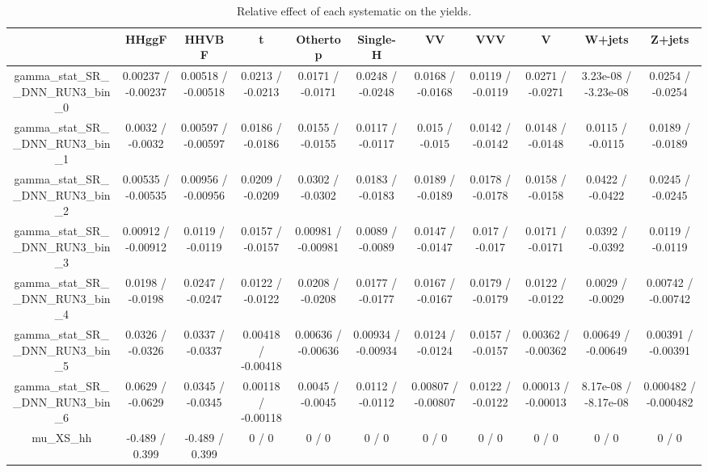 \documentclass[10pt]{article}
\begin{document}
\begin{table}[htbp]
\begin{center}
\begin{tabular}{|c|c|c|c|c|c|c|c|c|c|c|}
\hline 
      & HHggF      & HHVBF      & t      & Othertop      & Single-H      & VV      & VVV      & V      & W+jets      & Z+jets \\ 
\hline 
  gamma_stat_SR__DNN_RUN3_bin_0 & 0.00237 / -0.00237 & 0.00518 / -0.00518 & 0.0213 / -0.0213 & 0.0171 / -0.0171 & 0.0248 / -0.0248 & 0.0168 / -0.0168 & 0.0119 / -0.0119 & 0.0271 / -0.0271 & 3.23e-08 / -3.23e-08 & 0.0254 / -0.0254 \\ 
  gamma_stat_SR__DNN_RUN3_bin_1 & 0.0032 / -0.0032 & 0.00597 / -0.00597 & 0.0186 / -0.0186 & 0.0155 / -0.0155 & 0.0117 / -0.0117 & 0.015 / -0.015 & 0.0142 / -0.0142 & 0.0148 / -0.0148 & 0.0115 / -0.0115 & 0.0189 / -0.0189 \\ 
  gamma_stat_SR__DNN_RUN3_bin_2 & 0.00535 / -0.00535 & 0.00956 / -0.00956 & 0.0209 / -0.0209 & 0.0302 / -0.0302 & 0.0183 / -0.0183 & 0.0189 / -0.0189 & 0.0178 / -0.0178 & 0.0158 / -0.0158 & 0.0422 / -0.0422 & 0.0245 / -0.0245 \\ 
  gamma_stat_SR__DNN_RUN3_bin_3 & 0.00912 / -0.00912 & 0.0119 / -0.0119 & 0.0157 / -0.0157 & 0.00981 / -0.00981 & 0.0089 / -0.0089 & 0.0147 / -0.0147 & 0.017 / -0.017 & 0.0171 / -0.0171 & 0.0392 / -0.0392 & 0.0119 / -0.0119 \\ 
  gamma_stat_SR__DNN_RUN3_bin_4 & 0.0198 / -0.0198 & 0.0247 / -0.0247 & 0.0122 / -0.0122 & 0.0208 / -0.0208 & 0.0177 / -0.0177 & 0.0167 / -0.0167 & 0.0179 / -0.0179 & 0.0122 / -0.0122 & 0.0029 / -0.0029 & 0.00742 / -0.00742 \\ 
  gamma_stat_SR__DNN_RUN3_bin_5 & 0.0326 / -0.0326 & 0.0337 / -0.0337 & 0.00418 / -0.00418 & 0.00636 / -0.00636 & 0.00934 / -0.00934 & 0.0124 / -0.0124 & 0.0157 / -0.0157 & 0.00362 / -0.00362 & 0.00649 / -0.00649 & 0.00391 / -0.00391 \\ 
  gamma_stat_SR__DNN_RUN3_bin_6 & 0.0629 / -0.0629 & 0.0345 / -0.0345 & 0.00118 / -0.00118 & 0.0045 / -0.0045 & 0.0112 / -0.0112 & 0.00807 / -0.00807 & 0.0122 / -0.0122 & 0.00013 / -0.00013 & 8.17e-08 / -8.17e-08 & 0.000482 / -0.000482 \\ 
  mu_XS_hh & -0.489 / 0.399 & -0.489 / 0.399 & 0 / 0 & 0 / 0 & 0 / 0 & 0 / 0 & 0 / 0 & 0 / 0 & 0 / 0 & 0 / 0 \\ 
\hline 
\end{tabular} 
\caption{Relative effect of each systematic on the yields.} 
\end{center} 
\end{table} 
\end{document}
